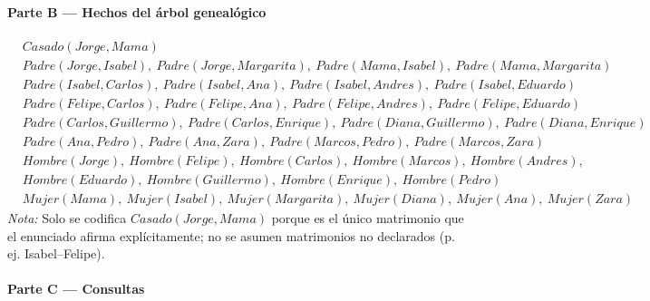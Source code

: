 \paragraph{Parte B --- Hechos del árbol genealógico}

\begin{align*}
    &Casado(Jorge,Mama)\\
    &Padre(Jorge,Isabel),\ Padre(Jorge,Margarita),\ Padre(Mama,Isabel),\ Padre(Mama,Margarita)\\
    &Padre(Isabel,Carlos),\ Padre(Isabel,Ana),\ Padre(Isabel,Andres),\ Padre(Isabel,Eduardo)\\
    &Padre(Felipe,Carlos),\ Padre(Felipe,Ana),\ Padre(Felipe,Andres),\ Padre(Felipe,Eduardo)\\
    &Padre(Carlos,Guillermo),\ Padre(Carlos,Enrique),\ Padre(Diana,Guillermo),\ Padre(Diana,Enrique)\\
    &Padre(Ana,Pedro),\ Padre(Ana,Zara),\ Padre(Marcos,Pedro),\ Padre(Marcos,Zara)\\[4pt]
    &Hombre(Jorge),\ Hombre(Felipe),\ Hombre(Carlos),\ Hombre(Marcos),\ Hombre(Andres),\\
    &Hombre(Eduardo),\ Hombre(Guillermo),\ Hombre(Enrique),\ Hombre(Pedro)\\[4pt]
    &Mujer(Mama),\ Mujer(Isabel),\ Mujer(Margarita),\ Mujer(Diana),\ Mujer(Ana),\ Mujer(Zara)
\end{align*}
\textit{Nota:} Solo se codifica $Casado(Jorge,Mama)$ porque es el único matrimonio que el enunciado
afirma explícitamente; no se asumen matrimonios no declarados (p. ej. Isabel--Felipe).

\paragraph{Parte C --- Consultas}

